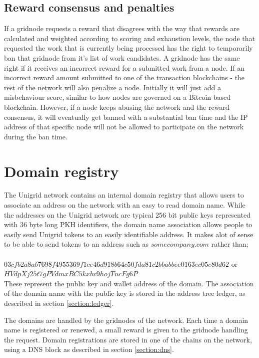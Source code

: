 \documentclass[10pt,a4paper,final]{article}
\begin{document}
\subsection{Reward consensus and penalties}
If a \gls{gridnode} requests a reward that disagrees with the way that rewards are calculated and weighted according to scoring and exhaustion levels, the node that requested the work that is currently being processed has the right to temporarily ban that \gls{gridnode} from it's list of work candidates. A \gls{gridnode} has the same right if it receives an incorrect reward for a submitted work from a node. If an incorrect reward amount submitted to one of the transaction blockchains - the rest of the network will also penalize a node. Initially it will just add a misbehaviour score, similar to how nodes are governed on a Bitcoin-based blockchain. However, if a node keeps abusing the network and the reward consensus, it will eventually get banned with a substantial ban time and the IP address of that specific node will not be allowed to participate on the network during the ban time.


\section{Domain registry}
\label{section:domain}
The Unigrid network contains an internal domain registry that allows users to associate an address on the network with an easy to read domain name. While the addresses on the Unigrid network are typical 256 bit public keys represented with 36 byte long PKH identifiers, the domain name association allows people to easily send Unigrid tokens to an easily identifiable address. It makes alot of sense to be able to send tokens to an address such as $somecompany.com$ rather than;
\\ \\
$03cfb2a8ab7698f4955369f1ce46d918b64c50fda81c2bbabbee0163ec05e80d62$ or\\
$HVdpXj25t7gPVdmxBC5kxbv9hojTncFg6P$\\

\noindent These represent the public key and wallet address of the domain. The association of the domain name with the public key is stored in the address tree ledger, as described in section \ref{section:ledger}.

The domains are handled by the \glspl{gridnode} of the network. Each time a domain name is registered or renewed, a small reward is given to the \gls{gridnode} handling the request. Domain registrations are stored in one of the chains on the network, using a DNS block as described in section \ref{section:dns}.
\end{document}
